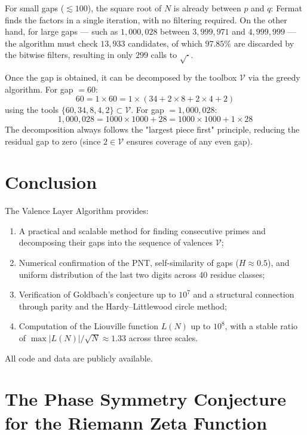 \documentclass[12pt,a4paper]{article}
\theoremstyle{plain}
\begin{document}
For small gaps ($\lesssim 100$), the square root of $N$ is
already between $p$ and $q$: Fermat finds the factors in a
single iteration, with no filtering required. On the other hand,
for large gaps --- such as $1,000,028$ between $3,999,971$ and
$4,999,999$ --- the algorithm must check $13,933$ candidates,
of which $97.85\%$ are discarded by the bitwise filters,
resulting in only $299$ calls to $\sqrt{\cdot}$.

Once the gap is obtained, it can be decomposed by the toolbox
$\mathcal{V}$ via the greedy algorithm. For gap $= 60$:
\[
60 = 1\times60 = 1\times(34 + 2\times 8 + 2\times 4 + 2)
\]
using the tools $\{60, 34, 8, 4, 2\} \subset \mathcal{V}$.
For gap $= 1,000,028$:
\[
1,000,028 = 1000\times1000 + 28 = 1000\times1000 + 1\times28
\]
The decomposition always follows the "largest piece first"
principle, reducing the residual gap to zero (since $2\in\mathcal{V}$
ensures coverage of any even gap).

\section{Conclusion}

The Valence Layer Algorithm provides:
\begin{enumerate}
  \item A practical and scalable method for finding consecutive primes
    and decomposing their gaps into the sequence of valences $\mathcal{V}$;
  \item Numerical confirmation of the PNT, self-similarity of gaps
    ($H\approx0.5$), and uniform distribution of the last two digits
    across 40 residue classes;
  \item Verification of Goldbach's conjecture up to $10^7$ and
    a structural connection through parity and the Hardy--Littlewood
    circle method;
  \item Computation of the Liouville function $L(N)$ up to $10^{8}$,
    with a stable ratio of $\max|L(N)|/\sqrt{N}\approx1.33$ across three scales.
\end{enumerate}

All code and data are publicly available.

\appendix
\section{The Phase Symmetry Conjecture for the Riemann Zeta Function}
\label{ap:phase_symmetry}

\begin{abstract}
We examine the boundary condition $K(s)K(1 - s) \in \mathbb{R}$ for the
valence operator $K(s) = 2^s - 1$, which is shown to be
algebraically equivalent to $\mathfrak{R}(s) = 1/2$ or
$\mathfrak{I}(s) = \frac{n\pi}{\ln 2}$ for $n \in \mathbb{Z}$. Under the
premise that no non-trivial zero of the Riemann Zeta function
$\zeta(s)$ lies outside the critical line unless it belongs to these
exceptional lines, we present a numerical sweep of 200 such lines
that validates the absence of candidates. The definitive analytical
exclusion of these exceptional lines remains an open problem
equivalent to the Riemann Hypothesis.
\end{abstract}
\end{document}
